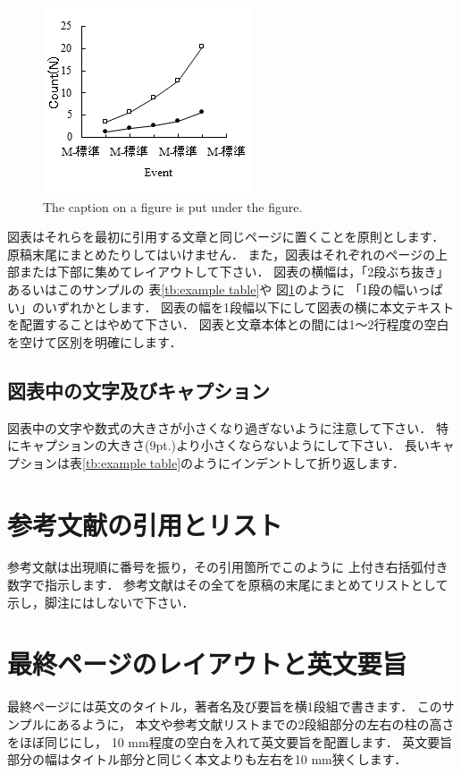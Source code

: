 \begin{figure}[tb]
  \centering
  \includegraphics[keepaspectratio=true,width=0.9\linewidth,height=0.25\paperheight]{./assets/figure.png}
  \caption{The caption on a figure is put under the figure.}
  \label{fig:example figure}
\end{figure}

図表はそれらを最初に引用する文章と同じページに置くことを原則とします．
原稿末尾にまとめたりしてはいけません．
また，図表はそれぞれのページの上部または下部に集めてレイアウトして下さい．
図表の横幅は，「2段ぶち抜き」あるいはこのサンプルの
表\ref{tb:example table}や
図\ref{fig:example figure}のように
「1段の幅いっぱい」のいずれかとします．
図表の幅を1段幅以下にして図表の横に本文テキストを配置することはやめて下さい．
図表と文章本体との間には1～2行程度の空白を空けて区別を明確にします．

\subsection{図表中の文字及びキャプション}

図表中の文字や数式の大きさが小さくなり過ぎないように注意して下さい．
特にキャプションの大きさ(9pt.)より小さくならないようにして下さい．
長いキャプションは表\ref{tb:example table}のようにインデントして折り返します．

\section{参考文献の引用とリスト}

参考文献は出現順に番号を振り，その引用箇所でこのように
\cite{物部水理学:inbook}
上付き右括弧付き数字で指示します．
参考文献はその全てを原稿の末尾にまとめてリストとして示し，脚注にはしないで下さい．

\section{最終ページのレイアウトと英文要旨}

最終ページには英文のタイトル，著者名及び要旨を横1段組で書きます．
このサンプルにあるように，
本文や参考文献リストまでの2段組部分の左右の柱の高さをほぼ同じにし，
10 mm程度の空白を入れて英文要旨を配置します．
英文要旨部分の幅はタイトル部分と同じく本文よりも左右を10 mm狭くします．
